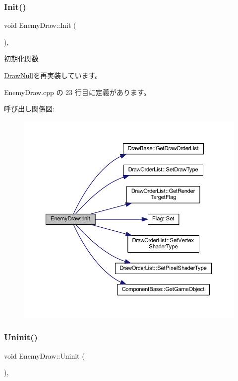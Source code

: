 \subsubsection{\texorpdfstring{Init()}{Init()}}
{\footnotesize\ttfamily void Enemy\+Draw\+::\+Init (\begin{DoxyParamCaption}{ }\end{DoxyParamCaption})\hspace{0.3cm}{\ttfamily [override]}, {\ttfamily [virtual]}}



初期化関数 



\mbox{\hyperlink{class_draw_null_acd7fef3ccea1da537ac9507ffbb6dd2e}{Draw\+Null}}を再実装しています。



 Enemy\+Draw.\+cpp の 23 行目に定義があります。

呼び出し関係図\+:\nopagebreak
\begin{figure}[H]
\begin{center}
\leavevmode
\includegraphics[width=350pt]{class_enemy_draw_aa1659c35fa757db6a6cf07e26ad9ddfb_cgraph}
\end{center}
\end{figure}
\mbox{\label{class_enemy_draw_a2861dc0623b0be7726bc69a6a469190e}} 
\subsubsection{\texorpdfstring{Uninit()}{Uninit()}}
{\footnotesize\ttfamily void Enemy\+Draw\+::\+Uninit (\begin{DoxyParamCaption}{ }\end{DoxyParamCaption})\hspace{0.3cm}{\ttfamily [override]}, {\ttfamily [virtual]}}



